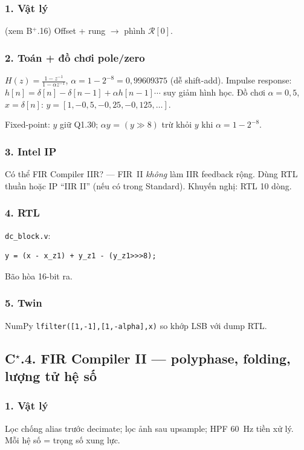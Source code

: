 \subsubsection*{1. Vật lý} (xem B$^+$.16) Offset + rung $\to$ phình $\mathcal{R}[0]$.

\subsubsection*{2. Toán + đồ chơi pole/zero}
$H(z)=\frac{1-z^{-1}}{1-\alpha z^{-1}}$, $\alpha=1-2^{-8}=0{,}99609375$ (dễ shift-add).
Impulse response: $h[n]=\delta[n]-\delta[n-1]+\alpha h[n-1]\cdots$ suy giảm hình học.
Đồ chơi $\alpha=0{,}5$, $x=\delta[n]$: $y=[1,-0{,}5,-0{,}25,-0{,}125,\ldots]$.

Fixed-point: $y$ giữ Q1.30; $\alpha y$ = $(y\gg8)$ trừ khỏi $y$ khi $\alpha=1-2^{-8}$.

\subsubsection*{3. Intel IP}
Có thể FIR Compiler IIR? --- FIR~II \emph{không} làm IIR feedback rộng. Dùng RTL thuần hoặc IP ``IIR II'' (nếu có trong Standard). Khuyến nghị: RTL 10 dòng.

\subsubsection*{4. RTL} \texttt{dc\_block.v}: 
\begin{verbatim}
y = (x - x_z1) + y_z1 - (y_z1>>>8);
\end{verbatim}
Bão hòa 16-bit ra.

\subsubsection*{5. Twin} NumPy \texttt{lfilter([1,-1],[1,-alpha],x)} so khớp LSB với dump RTL.

\subsection*{C$^\star$.4. FIR Compiler II --- polyphase, folding, lượng tử hệ số}

\subsubsection*{1. Vật lý}
Lọc chống alias trước decimate; lọc ảnh sau upsample; HPF 60~Hz tiền xử lý. Mỗi hệ số = trọng số xung lực.

